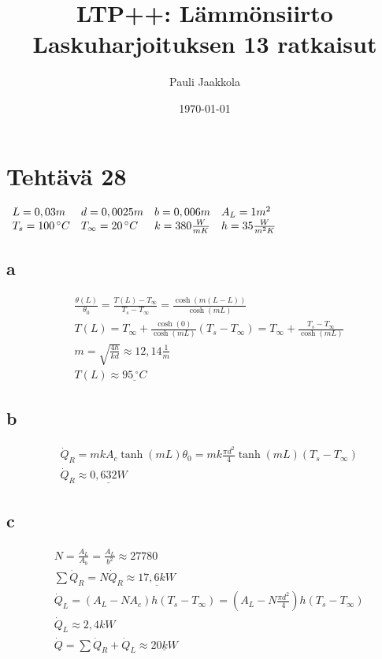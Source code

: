 \documentclass[12pt,a4paper,finnish]{article}
\title{LTP++: Lämmönsiirto\\Laskuharjoituksen 13 ratkaisut}
\date{\today}
\author{Pauli Jaakkola}
\begin{document}
\maketitle
\tableofcontents
\newpage

\section{Tehtävä 28}

\begin{math}
 \begin{array}{l l l l}
  L = 0,03m & d = 0,0025m & b = 0,006m & A_L = 1 m^2\\
  T_s = 100\,^{\circ}C & T_{\infty} = 20\,^{\circ}C & k = 380 \frac{W}{mK} & h = 35\frac{W}{m^2K}
 \end{array}
\end{math}

\subsection{a}

\begin{align}
 &\frac{\theta(L)}{\theta_0} = \frac{T(L) - T_{\infty}}{T_s - T_{\infty}} = \frac{\cosh(m(L - L))}{\cosh(mL)}\\
 &T(L) = T_{\infty} + \frac{\cosh(0)}{\cosh(mL)}(T_s - T_{\infty}) = T_{\infty} + \frac{T_s - T_{\infty}}{\cosh(mL)}\\
 &m = \sqrt{\frac{4h}{kd}} \approx 12,14 \frac{1}{m}\\
 &T(L) \approx \underline{95\,^{\circ}C}
\end{align}

\subsection{b}

\begin{align}
 &\dot{Q}_R = mkA_c\tanh(mL)\theta_0 = mk\frac{\pi d^2}{4}\tanh(mL)(T_s - T_{\infty})\\
 &\dot{Q}_R \approx \underline{0,632 W}
\end{align}

\subsection{c}

\begin{align}
 &N = \frac{A_L}{A_b} = \frac{A_L}{b^2} \approx 27780\\
 &\sum \dot{Q}_R = N\dot{Q}_R \approx \underline{17,6 kW}\\
 &\dot{Q}_L = (A_L - NA_c)h(T_s - T_{\infty}) = (A_L - N\frac{\pi d^2}{4})h(T_s - T_{\infty})\\
 &\dot{Q}_L \approx 2,4 kW\\
 &\dot{Q} = \sum \dot{Q}_R + \dot{Q}_L \approx \underline{20 kW}
\end{align}
\end{document}
